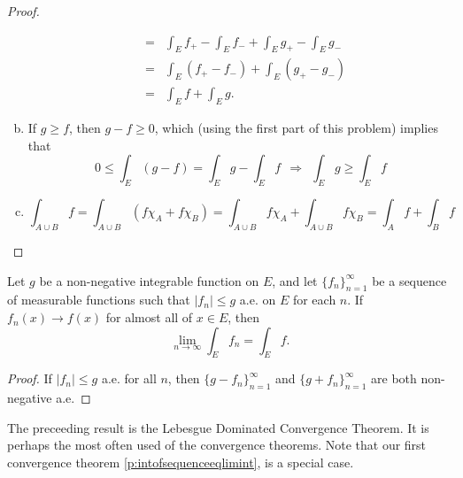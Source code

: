 \begin{pblm}
\begin{proof}
\begin{enumerate}[(a)]
\begin{equation*}
\begin{array}{rcl}
			& = & \int_Ef_+-\int_Ef_-+\int_Eg_+-\int_Eg_- \\ 	
			& = & \int_E(f_+-f_-) + \int_E(g_+-g_-) \\
			& = & \int_Ef + \int_Eg. 
	\end{array}
	\end{equation*}
	\item If $g \ge f$, then $g - f \ge 0$, which (using the first part of this problem) implies that 
		\begin{equation*}
			0 \le \int_E(g - f) = \int_Eg - \int_E f ~~\Rightarrow~~ \int_Eg \ge \int_Ef 
		\end{equation*}
	\item 
	\begin{equation*}
		\int_{A\cup B} f = \int_{A\cup B} \left(f \chi_A + f\chi_B\right) = 
		\int_{A\cup B} f\chi_A + \int_{A\cup B} f\chi_B = \int_A f + \int_B f
	\end{equation*}
	\end{enumerate}
\end{proof}
\end{pblm}

\begin{pblm}\label{p:lebesguedominatedconvergence}%
	Let $g$ be a non-negative integrable function on $E$, and let $\{f_n\}_{n=1}^\infty$ 
	be a sequence of measurable functions such that $|f_n| \le g$ a.e. on $E$ for each 
	$n$. If $f_n(x) \rightarrow f(x)$ for almost all of $x \in E$, then 
	\begin{equation*}
		\lim\limits_{n\to\infty}\int_Ef_n = \int_Ef. 
	\end{equation*}
\begin{proof}
	If $|f_n| \le g$ a.e. for all $n$, then 
	$\{g - f_n\}_{n=1}^\infty$ and $\{g + f_n\}_{n=1}^\infty$ are both non-negative a.e. 
\end{proof}
\end{pblm}

\begin{rmk}%
	The preceeding result is the Lebesgue Dominated Convergence Theorem. It is perhaps the 
	most often used of the convergence theorems. Note that our first convergence theorem 
	\ref{p:intofsequenceeqlimint}, is a special case. 
\end{rmk}

